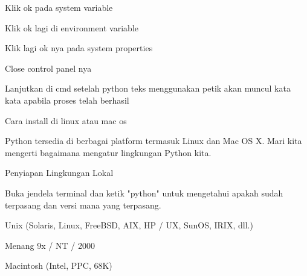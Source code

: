 \documentclass[a4paper,12pt]{report}
\begin{document}
\vspace{14pt}
\noindent 
{\fontsize{14pt}{14pt}\selectfont Klik ok pada system variable \\} \par
\noindent 
{\fontsize{14pt}{14pt}\selectfont Klik ok lagi di environment variable \\} \par
\vspace{14pt}
\noindent 
{\fontsize{14pt}{14pt}\selectfont Klik lagi ok nya pada system properties \\} \par
\vspace{14pt}
\noindent 
{\fontsize{14pt}{14pt}\selectfont Close control panel nya \\} \par
\vspace{14pt}
\noindent 
{\fontsize{14pt}{14pt}\selectfont Lanjutkan di cmd setelah python teks menggunakan petik akan muncul kata kata apabila proses telah berhasil \\} \par
\vspace{14pt}
\noindent 
{\fontsize{14pt}{14pt}\selectfont Cara install di linux atau mac os \\} \par
\vspace{14pt}
\noindent 
{\fontsize{14pt}{14pt}\selectfont Python tersedia di berbagai platform termasuk Linux dan Mac OS X. Mari kita mengerti bagaimana mengatur lingkungan Python kita. \\} \par
\vspace{14pt}
\noindent 
{\fontsize{14pt}{14pt}\selectfont Penyiapan Lingkungan Lokal \\} \par
\noindent 
{\fontsize{14pt}{14pt}\selectfont Buka jendela terminal dan ketik "python" untuk mengetahui apakah sudah terpasang dan versi mana yang terpasang. \\} \par
\vspace{14pt}
\noindent 
{\fontsize{14pt}{14pt}\selectfont Unix (Solaris, Linux, FreeBSD, AIX, HP / UX, SunOS, IRIX, dll.) \\} \par
\noindent 
{\fontsize{14pt}{14pt}\selectfont Menang 9x / NT / 2000 \\} \par
\noindent 
{\fontsize{14pt}{14pt}\selectfont Macintosh (Intel, PPC, 68K) \\} \par
\end{document}
